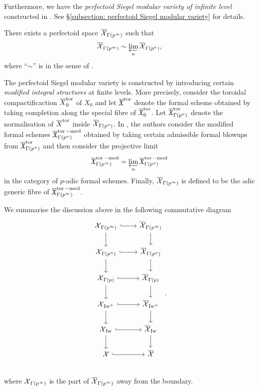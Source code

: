 Furthermore, we have the \emph{perfectoid Siegel modular variety of infinite level} constructed in \cite{Pilloni-Stroh-CoherentCohomologyandGaloisRepresentations}. See \S \ref{subsection: perfectoid Siegel modular variety} for details.

\begin{Theorem}\label{Theorem: perfectoid toroidally compactified Siegel modular variety}
There exists a perfectoid space $\overline{\operatorname{\mathcal{X}}}_{\Gamma(p^{\infty})}$ such that $$\overline{\operatorname{\mathcal{X}}}_{\Gamma(p^{\infty})}\sim \varprojlim_{n}\overline{\operatorname{\mathcal{X}}}_{\Gamma(p^n)},$$ where ``$\sim$'' is in the sense of \cite[Definition 2.4.1]{Scholze-Weinstein}.
\end{Theorem}

\begin{Remark}
\normalfont The perfectoid Siegel modular variety is constructed by introducing certain \emph{modified integral structures} at  finite levels. More precisely, consider the toroidal compactificaction $\overline{X}_0^{\operatorname{tor}}$ of $X_0$ and let $\overline{\operatorname{\mathfrak{X}}}^{\operatorname{tor}}$ denote the formal scheme obtained by taking completion along the special fibre of $\overline{\operatorname{\mathfrak{X}}}_0^{\operatorname{tor}}$. Let $\overline{\operatorname{\mathfrak{X}}}^{\operatorname{tor}}_{\Gamma(p^n)}$ denote the normalisation of $\overline{X}^{\operatorname{tor}}$ inside $\overline{\operatorname{\mathcal{X}}}_{\Gamma(p^n)}$. In \cite{Pilloni-Stroh-CoherentCohomologyandGaloisRepresentations}, the authors consider the modified formal schemes $\overline{\operatorname{\mathfrak{X}}}^{\operatorname{tor}-\text{mod}}_{\Gamma(p^n)}$ obtained by taking certain admissible formal blowups from $\overline{\operatorname{\mathfrak{X}}}^{\operatorname{tor}}_{\Gamma(p^n)}$ and then consider the projective limit
$$\overline{\operatorname{\mathfrak{X}}}^{\operatorname{tor}-\text{mod}}_{\Gamma(p^{\infty})}=\varprojlim_n \overline{\operatorname{\mathfrak{X}}}^{\operatorname{tor}-\text{mod}}_{\Gamma(p^n)}$$
in the category of $p$-adic formal schemes. Finally, $\overline{\operatorname{\mathcal{X}}}_{\Gamma(p^{\infty})}$ is defined to be the adic generic fibre of $\overline{\operatorname{\mathfrak{X}}}^{\operatorname{tor}-\text{mod}}_{\Gamma(p^{\infty})}$.
\end{Remark}

We summarise the discussion above in the following commutative diagram $$\begin{tikzcd}
\calX_{\Gamma(p^\infty)}\arrow[r, hook]\arrow[d] & \overline{\calX}_{\Gamma(p^\infty)}\arrow[d]\\
\calX_{\Gamma(p^n)}\arrow[r, hook]\arrow[d] & \overline{\calX}_{\Gamma(p^n)}\arrow[d]\\
\calX_{\Gamma(p)}\arrow[r, hook]\arrow[d] & \overline{\calX}_{\Gamma(p)}\arrow[d]\\
\calX_{\Iw^+}\arrow[r, hook]\arrow[d] & \overline{\calX}_{\Iw^+}\arrow[d]\\
\calX_{\Iw}\arrow[r, hook]\arrow[d] & \overline{\calX}_{\Iw}\arrow[d]\\
\calX \arrow[r, hook] & \overline{\calX}\\
\end{tikzcd}.$$ 
where $\operatorname{\mathcal{X}}_{\Gamma(p^\infty)}$ is the part of $\overline{\operatorname{\mathcal{X}}}_{\Gamma(p^\infty)}$ away from the boundary.

